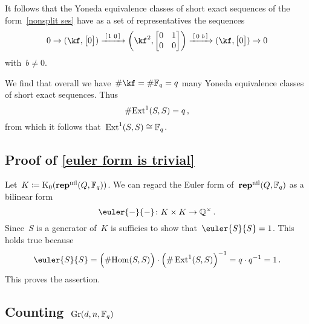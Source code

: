 \documentclass[a4paper,11pt]{scrartcl}
\begin{document}
It follows that the Yoneda equivalence classes of short exact sequences of the form~\eqref{nonsplit ses} have as a set of representatives the sequences
\[ 
  0
  \to
  (\kf, \begin{bmatrix} 0 \end{bmatrix})
  \xlongto{ \begin{bsmallmatrix} 1 & 0 \end{bsmallmatrix} }
  \biggl( \kf^2, \begin{bmatrix} 0 & 1 \\ 0 & 0 \end{bmatrix} \biggr)
  \xlongto{ \begin{bsmallmatrix} 0 & b \end{bsmallmatrix} }
  (\kf, \begin{bmatrix} 0 \end{bmatrix})
  \to
  0
\]
with~$b \neq 0$.

We find that overall we have~$\counting \kf = \counting \Finite_q = q$ many Yoneda equivalence classes of short exact sequences.
Thus
\[
  \# {\operatorname{Ext}^1(S,S)}
  =
  q \,,
\]
from which it follows that~$\operatorname{Ext}^1(S,S) \cong \mathbb{F}_q$.





\subsection{Proof of \cref{euler form is trivial}}
\label{proof of euler form is trivial}

Let~$K \coloneqq \operatorname{K}_0(\mathbf{rep}^{\mathrm{nil}}(Q, \mathbb{F}_q))$.
We can regard the Euler form of~$\mathbf{rep}^{\mathrm{nil}}(Q, \mathbb{F}_q)$ as a bilinear form
\[
  \euler{-}{-}
  \colon
  K \times K
  \to
  \Rational^\times \,.
\]
Since~$S$ is a generator of~$K$ is sufficies to show that~$\euler{S}{S} = 1$.
This holds true because
\[
  \euler{S}{S}
  =
  \Bigl( \counting {\Hom(S,S)} \Bigr)
  \cdot
  \Bigl( \counting \Ext^1(S,S) \Bigr)^{-1}
  =
  q \cdot q^{-1}
  =
  1 \,.
\]
This proves the assertion.


\subsection{Counting~$\operatorname{Gr}(d, n, \mathbb{F}_q)$}
\label{size of quantum grassmannian}
\end{document}
